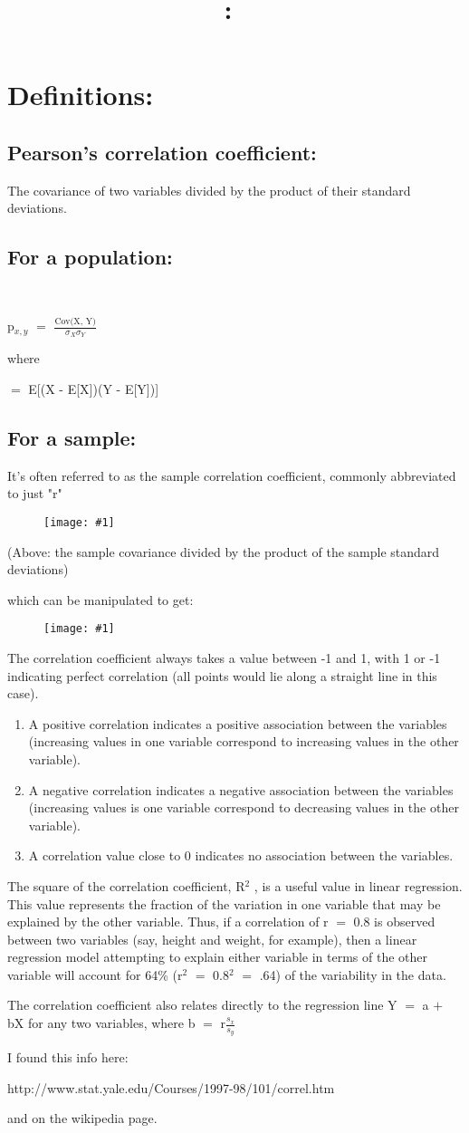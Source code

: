 \documentclass{article}
\title{
    \vspace{2in}
    \textmd{\textbf{\hmwkClass:\ \hmwkTitle}}\\
    \normalsize\vspace{0.1in}\small\vspace{0.1in}\large{\textit{\hmwkClassInstructor}}
    \vspace{3in}
}
\author{\hmwkAuthorName}
\date{}
\newcommand{\mt}[1]{\ensuremath{#1}}
\newcommand\bsc[2][\DefaultOpt]{%
  \def\DefaultOpt{#2}%
  \section[#1]{#2}%
}
\newcommand\ssc[2][\DefaultOpt]{%
  \def\DefaultOpt{#2}%
  \subsection[#1]{#2}%
}
\newcommand{\balist}{\begin{enumerate}[label=\alph*.]}
\newcommand{\elist}{\end{enumerate}}
\newcommand{\ps}{\mt{\operatorname{+}} }
\newcommand{\ms}{\mt{\operatorname{-}} }
\newcommand{\eql}{ \mt{\operatorname{=}} }
\newcommand{\uw}[2]{#1\mt{_{#2}}}
\newcommand{\uf}[2]{#1\mt{^{#2}}}
\newcommand{\frc}[2]{\mt{\frac{#1}{#2}}}
\newcommand{\txt}[1]{\text{#1}} %
\newcommand{\sg}{\mt{\sigma}}
\newcommand{\exv}[1]{E[#1]}
\newcommand{\cov}[2]{\txt{Cov(#1, #2)}}
\newcommand{\img}[1]{
\begin{figure}[h]
  \texttt{[image: \#1]}
\end{figure}
}
\begin{document}
\bsc{Definitions:}{


\ssc{Pearson's correlation coefficient:}{
The covariance of two variables divided by the product of their standard deviations.
}

\ssc{For a population:} {

\

\uw{p}{x, y} \eql \frc{\cov{X}{Y}}{\uw{\sg}{X}\uw{\sg}{Y}}

where

\cov{X}{Y} \eql \exv{(X \ms \exv{X})(Y \ms \exv{Y})}
}
\ssc{For a sample:}{

It's often referred to as the sample correlation coefficient, commonly abbreviated to just "r"

\img{reqn.png}

(Above: the sample covariance divided by the product of the sample standard deviations)

which can be manipulated to get:

\img{reqn2.png}
}

The correlation coefficient always takes a value between -1 and 1, with 1 or -1 indicating perfect correlation (all points would lie along a straight line in this case).
\balist
\item A positive correlation indicates a positive association between the variables (increasing values in one variable correspond to increasing values in the other variable).
\item A negative correlation indicates a negative association between the variables (increasing values is one variable correspond to decreasing values in the other variable).
\item A correlation value close to 0 indicates no association between the variables.
\elist

The square of the correlation coefficient, \uf{R}{2}	, is a useful value in linear regression. This value represents the fraction of the variation in one variable that may be explained by the other variable. Thus, if a correlation of r \eql 0.8 is observed between two variables (say, height and weight, for example), then a linear regression model attempting to explain either variable in terms of the other variable will account for 64\% (\uf{r}{2} \eql \uf{0.8}{2} \eql .64) of the variability in the data.

The correlation coefficient also relates directly to the regression line Y \eql a \ps bX for any two variables, where b \eql r\frc{\uw{s}{x}}{\uw{s}{y}}

I found this info here: 

http://www.stat.yale.edu/Courses/1997-98/101/correl.htm

and on the wikipedia page.


}
\newpage
\end{document}
